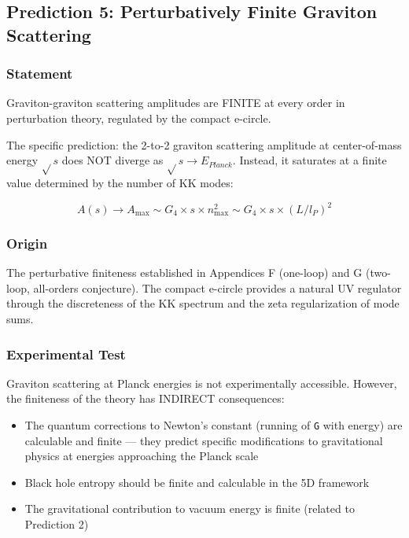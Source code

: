 \documentclass[aps,prd,preprint,superscriptaddress,longbibliography,floatfix]{revtex4-2}
\theoremstyle{remark}
\begin{document}
\subsection{Prediction 5: Perturbatively Finite Graviton Scattering}


\subsubsection{Statement}

Graviton-graviton scattering amplitudes are FINITE at every order in perturbation theory, regulated by the compact e-circle.

The specific prediction: the 2-to-2 graviton scattering amplitude at center-of-mass energy $\sqrt{}s$ does NOT diverge as $\sqrt{}s \to E_{Planck}$. Instead, it saturates at a finite value determined by the number of KK modes:


\begin{equation}
    A(s) \to A_{\max} \sim  G_{4} \times s \times n_{\max}^{2} \sim  G_{4} \times s \times (L/l_P)^{2}
\end{equation}

\subsubsection{Origin}

The perturbative finiteness established in Appendices F (one-loop) and G (two-loop, all-orders conjecture). The compact e-circle provides a natural UV regulator through the discreteness of the KK spectrum and the zeta regularization of mode sums.


\subsubsection{Experimental Test}

Graviton scattering at Planck energies is not experimentally accessible. However, the finiteness of the theory has INDIRECT consequences:

\begin{itemize}
  \item The quantum corrections to Newton's constant (running of \texttt{G} with energy) are calculable and finite --- they predict specific modifications to gravitational physics at energies approaching the Planck scale
  \item Black hole entropy should be finite and calculable in the 5D framework
  \item The gravitational contribution to vacuum energy is finite (related to Prediction 2)
\end{itemize}
\end{document}
